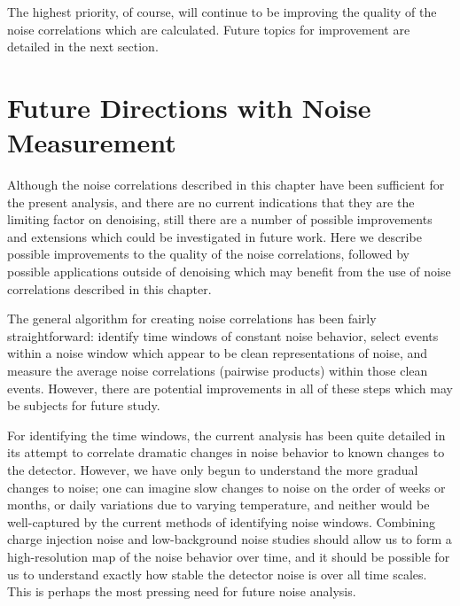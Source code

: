 The highest priority, of course, will continue to be improving the quality of the noise correlations which are calculated.  Future topics for improvement are detailed in the next section.

\section{Future Directions with Noise Measurement}\label{sec:NoiseCorrelationsFuture}

Although the noise correlations described in this chapter have been sufficient for the present analysis, and there are no current indications that they are the limiting factor on denoising, still there are a number of possible improvements and extensions which could be investigated in future work.  Here we describe possible improvements to the quality of the noise correlations, followed by possible applications outside of denoising which may benefit from the use of noise correlations described in this chapter.

The general algorithm for creating noise correlations has been fairly straightforward: identify time windows of constant noise behavior, select events within a noise window which appear to be clean representations of noise, and measure the average noise correlations (pairwise products) within those clean events.  However, there are potential improvements in all of these steps which may be subjects for future study.

For identifying the time windows, the current analysis has been quite detailed in its attempt to correlate dramatic changes in noise behavior to known changes to the detector.  However, we have only begun to understand the more gradual changes to noise; one can imagine slow changes to noise on the order of weeks or months, or daily variations due to varying temperature, and neither would be well-captured by the current methods of identifying noise windows.  Combining charge injection noise and low-background noise studies should allow us to form a high-resolution map of the noise behavior over time, and it should be possible for us to understand exactly how stable the detector noise is over all time scales.  This is perhaps the most pressing need for future noise analysis.

